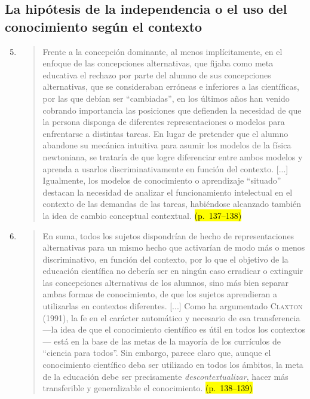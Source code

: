 \documentclass{article}
\begin{document}
\subsection*{La hipótesis de la independencia o el uso del conocimiento según el contexto}

\begin{enumerate}
  \setcounter{enumi}{4}

  \item
  \begin{quote}
  Frente a la concepción dominante, al menos implícitamente, en el enfoque de las concepciones alternativas, que fijaba como meta educativa el rechazo por parte del alumno de sus concepciones alternativas, que se consideraban erróneas e inferiores a las científicas, por las que debían ser “cambiadas”, en los últimos años han venido cobrando importancia las posiciones que defienden la necesidad de que la persona disponga de diferentes representaciones o modelos para enfrentarse a distintas tareas. En lugar de pretender que el alumno abandone su mecánica intuitiva para asumir los modelos de la física newtoniana, se trataría de que logre diferenciar entre ambos modelos y aprenda a usarlos discriminativamente en función del contexto. [...] Igualmente, los modelos de conocimiento o aprendizaje “situado” destacan la necesidad de analizar el funcionamiento intelectual en el contexto de las demandas de las tareas, habiéndose alcanzado también la idea de cambio conceptual contextual. \hl{(p.~137–138)}
  \end{quote}

  \item
  \begin{quote}
  En suma, todos los sujetos dispondrían de hecho de representaciones alternativas para un mismo hecho que activarían de modo más o menos discriminativo, en función del contexto, por lo que el objetivo de la educación científica no debería ser en ningún caso erradicar o extinguir las concepciones alternativas de los alumnos, sino más bien separar ambas formas de conocimiento, de que los sujetos aprendieran a utilizarlas en contextos diferentes. [...] Como ha argumentado \textsc{Claxton} (1991), la fe en el carácter automático y necesario de esa transferencia —la idea de que el conocimiento científico es útil en todos los contextos— está en la base de las metas de la mayoría de los currículos de “ciencia para todos”. Sin embargo, parece claro que, aunque el conocimiento científico deba ser utilizado en todos los ámbitos, la meta de la educación debe ser precisamente \textit{descontextualizar}, hacer más transferible y generalizable el conocimiento. \hl{(p.~138–139)}
  \end{quote}
\end{enumerate}
\end{document}
